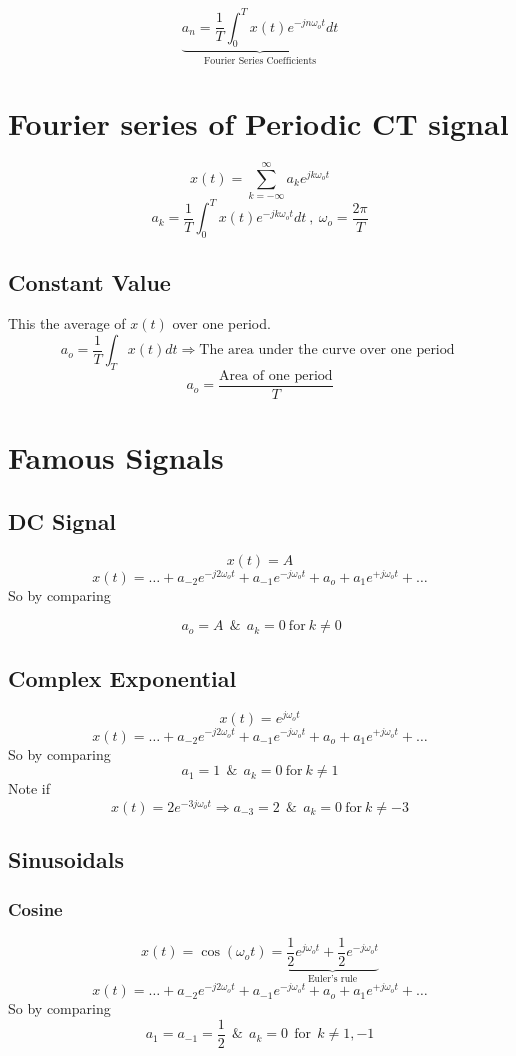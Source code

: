 \documentclass[11pt,a4paper]{article}
\theoremstyle{definition}
\begin{document}
\[
    \underbrace{a_n = \dfrac{1}{T} \int_0^T x(t)e^{-jn\omega_ot} dt }_{\text{Fourier Series Coefficients}}
\]

\section{Fourier series of Periodic CT signal}

\[
    \displaystyle x(t) = \sum_{k=-\infty}^{\infty} a_k e^{jk\omega_ot}
\]
\[
    a_k = \dfrac{1}{T} \int_0^T x(t)e^{-jk\omega_ot} dt \ , \ \omega_o
    = \dfrac{2\pi}{T}
\]
\subsection{Constant Value}
This the average of $x(t)$ over one period.
\[
    a_o = \dfrac{1}{T} \int_T x(t) dt \Rightarrow \text{The area under the curve over one period }
\]
\[
    a_o = \dfrac{\text{Area of one period}}{T}
\]
\section{Famous Signals}
\subsection{DC Signal}
\[
    x(t) = A
\]
\[
    x(t) = \dots + a_{-2}e^{-j2\omega_ot}
    + a_{-1}e^{-j\omega_ot} + a_o + a_{1}e^{+j\omega_ot} + \dots
\]
So by comparing 

\[
    \boxed{\ a_o = A \ \ \& \ \  a_k = 0 \ \text{for} \ k \neq 0}
\]
\subsection{Complex Exponential}
\[
    x(t) = e^{j\omega_ot}
\]
\[
    x(t) = \dots + a_{-2}e^{-j2\omega_ot}
    + a_{-1}e^{-j\omega_ot} + a_o + a_{1}e^{+j\omega_ot} + \dots
\]
So by comparing 
\[
    \boxed{a_1 = 1 \ \ \& \ \ a_k = 0  \ \text{for} \  k \neq 1}
\]
Note if 
\[
    x(t) = 2e^{-3j\omega_ot} \Rightarrow a_{-3} = 2 \ \ \& \ \ a_k = 0  \ \text{for} \ k \neq -3
\]
\subsection{Sinusoidals}
\subsubsection{Cosine}
\[
    x(t) = \cos(\omega_ot) = \underbrace{\dfrac{1}{2} e^{j\omega_ot} + \dfrac{1}{2} e^{-j\omega_ot}}_{\text{Euler's rule}}
\]
\[
    x(t) = \dots + a_{-2}e^{-j2\omega_ot}
    + a_{-1}e^{-j\omega_ot} + a_o + a_{1}e^{+j\omega_ot} + \dots
\]
So by comparing 
\[
    \boxed{a_1 = a_{-1} = \frac{1}{2} \ \ \& \ \ a_k = 0  \ \
    \text{for} \ \ k \neq 1, -1 }
\]
\end{document}
